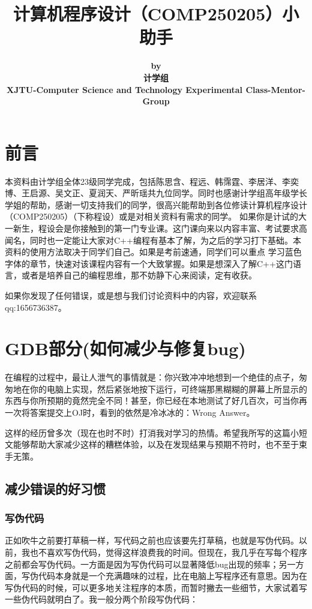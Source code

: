 \documentclass[UTF8]{ctexart}
\title{计算机程序设计（COMP250205）小助手}
\author{%
	\textbf{\large by}\\ %
    \textbf{\large 计学组}\\ %
    \textbf{\large XJTU-Computer Science and Technology Experimental Class-Mentor-Group}\\ %
}
\date{}
\begin{document}
	\maketitle
	\thispagestyle{empty}
	\newpage
	\setcounter{page}{1}
\newpage
\tableofcontents
\newpage
\thispagestyle{fancy} %
\fancyhf{} %
\section{前言}
本资料由计学组全体23级同学完成，包括陈思含、程远、韩霈霆、李居洋、李奕博、王启源、吴文正、夏润天、严昕瑶共九位同学。同时也感谢计学组高年级学长学姐的帮助，感谢一切支持我们的同学，很高兴能帮助到各位修读计算机程序设计（COMP250205）（下称程设）或是对相关资料有需求的同学。
如果你是计试的大一新生，程设会是你接触到的第一门专业课。这门课向来以内容丰富、考试要求高闻名，同时也一定能让大家对C++编程有基本了解，为之后的学习打下基础。本资料的使用方法取决于同学们自己。如果是考前速通，同学们可以重点
学习蓝色字体的章节，快速对该课程内容有一个大致掌握。如果是想深入了解C++这门语言，或者是培养自己的编程思维，那不妨静下心来阅读，定有收获。

如果你发现了任何错误，或是想与我们讨论资料中的内容，欢迎联系qq:1656736387。
\newpage
\section{GDB部分(如何减少与修复bug)}
在编程的过程中，最让人泄气的事情就是：你兴致冲冲地想到一个绝佳的点子，匆匆地在你的电脑上实现，然后紧张地按下运行，可终端那黑糊糊的屏幕上所显示的东西与你所预期的竟然完全不同！甚至，你已经在本地测试了好几百次，可当你再一次将答案提交上OJ时，看到的依然是冷冰冰的：Wrong Answer。

这样的经历曾多次（现在也时不时）打消我对学习的热情。希望我所写的这篇小短文能够帮助大家减少这样的糟糕体验，以及在发现结果与预期不符时，也不至于束手无策。

\subsection{减少错误的好习惯}

\subsubsection{写伪代码}
正如吹牛之前要打草稿一样，写代码之前也应该要先打草稿，也就是写伪代码。以前，我也不喜欢写伪代码，觉得这样浪费我的时间。但现在，我几乎在写每个程序之前都会写伪代码。一方面是因为写伪代码可以显著降低bug出现的频率；另一方面，写伪代码本身就是一个充满趣味的过程，比在电脑上写程序还有意思。因为在写伪代码的时候，可以更多地关注程序的本质，而暂时撇去一些细节，大家试着写一些伪代码就明白了。我一般分两个阶段写伪代码：
\end{document}
